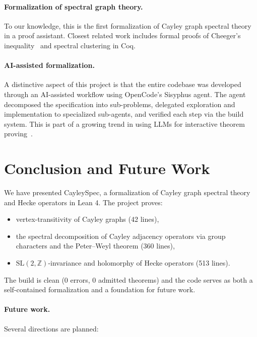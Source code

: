 \documentclass[11pt]{article}
\theoremstyle{plain}
\theoremstyle{definition}
\theoremstyle{remark}
\begin{document}
\paragraph{Formalization of spectral graph theory.}
To our knowledge, this is the first formalization of Cayley graph spectral theory in a proof assistant.
Closest related work includes formal proofs of Cheeger's inequality~\cite{nakano2024cheeger} and spectral clustering in Coq.

\paragraph{AI-assisted formalization.}
A distinctive aspect of this project is that the entire codebase was developed through an AI-assisted workflow using OpenCode's Sisyphus agent.
The agent decomposed the specification into sub-problems, delegated exploration and implementation to specialized sub-agents, and verified each step via the build system.
This is part of a growing trend in using LLMs for interactive theorem proving~\cite{first2023gptlean, thakur2024largelanguage, jiang2024draft}.

\section{Conclusion and Future Work}
\label{sec:conclusion}

We have presented CayleySpec, a formalization of Cayley graph spectral theory and Hecke operators in Lean 4.
The project proves:
\begin{itemize}
  \item vertex-transitivity of Cayley graphs (42 lines),
  \item the spectral decomposition of Cayley adjacency operators via group characters and the Peter--Weyl theorem (360 lines),
  \item $\mathrm{SL}(2,\mathbb{Z})$-invariance and holomorphy of Hecke operators (513 lines).
\end{itemize}

The build is clean (0 errors, 0 admitted theorems) and the code serves as both a self-contained formalization and a foundation for future work.

\paragraph{Future work.}
Several directions are planned:
\end{document}
